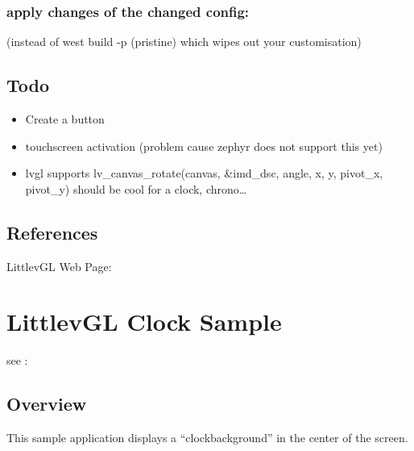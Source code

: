\documentclass[letterpaper,10pt,english]{sphinxmanual}
\begin{document}
\subsection{apply changes of the changed config:}
\label{\detokenize{lvgl:apply-changes-of-the-changed-config}}
\begin{sphinxVerbatim}[commandchars=\\\{\}]
\end{sphinxVerbatim}

(instead of west build -p (pristine) which wipes out your customisation)


\section{Todo}
\label{\detokenize{lvgl:todo}}\begin{itemize}
\item {} 
Create a button

\item {} 
touchscreen activation (problem cause zephyr does not support this yet)

\item {} 
lvgl supports lv\_canvas\_rotate(canvas, \&imd\_dsc, angle, x, y, pivot\_x, pivot\_y) should be cool for a clock, chrono…

\end{itemize}


\section{References}
\label{\detokenize{lvgl:references}}

LittlevGL Web Page: 


\chapter{LittlevGL Clock Sample}
\label{\detokenize{clock:littlevgl-clock-sample}}\label{\detokenize{clock:lvgl-clock}}\label{\detokenize{clock::doc}}
see : {\hyperref[\detokenize{samples/gui/clock/README:clock-sample}]{}}


\section{Overview}
\label{\detokenize{clock:overview}}
This sample application displays a “clockbackground” in the center of the screen.
\end{document}
